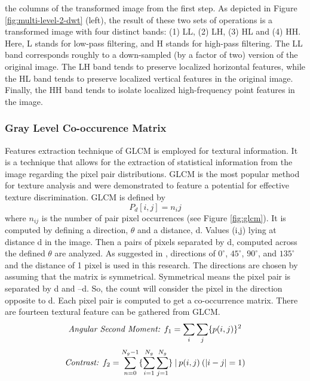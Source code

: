 \documentclass{article}
\begin{document}
	the columns of the transformed image from the first step. As depicted in Figure \ref{fig:multi-level-2-dwt} (left), the result of these two sets of operations is a transformed image with four distinct bands: (1) LL, (2) LH, (3) HL and (4)
	HH. Here, L stands for low-pass filtering, and H stands for high-pass filtering. The LL band corresponds
	roughly to a down-sampled (by a factor of two) version of the original image. The LH band tends to preserve
	localized horizontal features, while the HL band tends to preserve localized vertical features in the original
	image. Finally, the HH band tends to isolate localized high-frequency point features in the image.
	\subsubsection{Gray Level Co-occurence Matrix}
	Features extraction technique of GLCM is employed for
	textural information. It is a technique that allows for the
	extraction of statistical information from the image regarding
	the pixel pair distributions. GLCM is the most popular
	method for texture analysis and were demonstrated to feature
	a potential for effective texture discrimination. GLCM is defined by
	\begin{equation}
		P_d[i, j] = n_ij
		\label{eq:glcm}
	\end{equation}
	where $n_{ij}$ is the number of pair pixel occurrences (see Figure \ref{fig:glcm}). It is computed	by defining a direction, $\theta$ and a distance, d. Values (i,j) lying	at distance d in the image. Then a pairs of pixels separated by d, computed across the defined $\theta$ are analyzed. As suggested in \cite{610-620}, directions of $0^{\circ}$, $45^{\circ}$, $90^{\circ}$, and $135^{\circ}$ and the distance of 1 pixel is used in this research. The directions are chosen by assuming that the matrix is symmetrical. Symmetrical means the pixel pair is separated by d and –d. So, the count will consider the pixel in the direction opposite to d. Each pixel pair is computed to get a co-occurrence matrix. There are fourteen textural feature can be gathered from GLCM.
	\begin{equation}
		\textit{\text{Angular Second Moment: }} f_1 = \sum_{i} \sum_{j} \{p(i,j)\}^2
		\label{eq:glcm_asm}
	\end{equation}
	\begin{equation}
		\textit{\text{Contrast: }} f_2 = \sum_{n=0}^{N_g - 1} \{\sum_{i=1}^{N_g} \sum_{j=1}^{N_g}\} \: | \: p(i,j) \: (|i - j| = 1)
		\label{eq:glcm_contrast}
	\end{equation}
\end{document}
